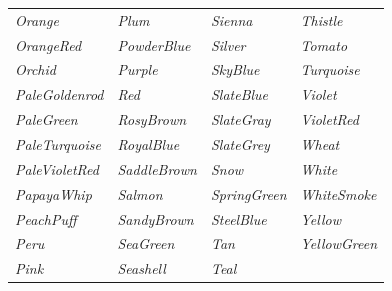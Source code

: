 \documentclass{article}
\newcommand\myfcolorbox[1]{\fcolorbox{black}{#1}{\phantom{\tiny{color}}} \textit{#1}\quad}
\begin{document}
\begin{center}
\begin{tabular}{llll}
			\myfcolorbox{Orange} & \myfcolorbox{Plum} & \myfcolorbox{Sienna} & \myfcolorbox{Thistle} \\
			
			\myfcolorbox{OrangeRed} & \myfcolorbox{PowderBlue} & \myfcolorbox{Silver} & \myfcolorbox{Tomato} \\
			
			\myfcolorbox{Orchid} & \myfcolorbox{Purple} & \myfcolorbox{SkyBlue} & \myfcolorbox{Turquoise} \\
			
			\myfcolorbox{PaleGoldenrod} & \myfcolorbox{Red} & \myfcolorbox{SlateBlue} & \myfcolorbox{Violet} \\
			
			\myfcolorbox{PaleGreen} & \myfcolorbox{RosyBrown} & \myfcolorbox{SlateGray} & \myfcolorbox{VioletRed} \\
			
			\myfcolorbox{PaleTurquoise} & \myfcolorbox{RoyalBlue} & \myfcolorbox{SlateGrey} & \myfcolorbox{Wheat} \\
			
			\myfcolorbox{PaleVioletRed} & \myfcolorbox{SaddleBrown} & \myfcolorbox{Snow} & \myfcolorbox{White} \\
			
			\myfcolorbox{PapayaWhip} & \myfcolorbox{Salmon} & \myfcolorbox{SpringGreen} & \myfcolorbox{WhiteSmoke} \\
			
			\myfcolorbox{PeachPuff} & \myfcolorbox{SandyBrown} & \myfcolorbox{SteelBlue} & \myfcolorbox{Yellow} \\
			
			\myfcolorbox{Peru} & \myfcolorbox{SeaGreen} & \myfcolorbox{Tan} & \myfcolorbox{YellowGreen} \\
			
			\myfcolorbox{Pink} & \myfcolorbox{Seashell} & \myfcolorbox{Teal}
		\end{tabular}
	\end{center}
\end{document}
